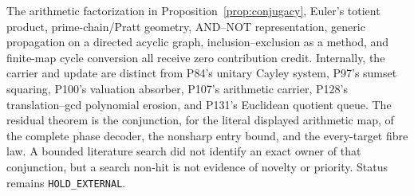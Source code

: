 \documentclass[10pt,a4paper]{amsart}
\theoremstyle{definition}
\theoremstyle{remark}
\begin{document}
The arithmetic factorization in Proposition~\ref{prop:conjugacy}, Euler's
totient product, prime-chain/Pratt geometry, AND--NOT representation,
generic propagation on a directed acyclic graph, inclusion--exclusion as a
method, and finite-map cycle conversion all receive zero contribution
credit.  Internally, the carrier and update are distinct from P84's unitary
Cayley system, P97's sumset squaring, P100's valuation absorber, P107's
arithmetic carrier, P128's translation--gcd polynomial erosion, and P131's
Euclidean quotient queue.  The residual theorem is the conjunction, for the
literal displayed arithmetic map, of the complete phase decoder, the
nonsharp entry bound, and the every-target fibre law.  A bounded literature
search did not identify an exact owner of that conjunction, but a search
non-hit is not evidence of novelty or priority.  Status remains
\texttt{HOLD\_EXTERNAL}.



\end{document}
